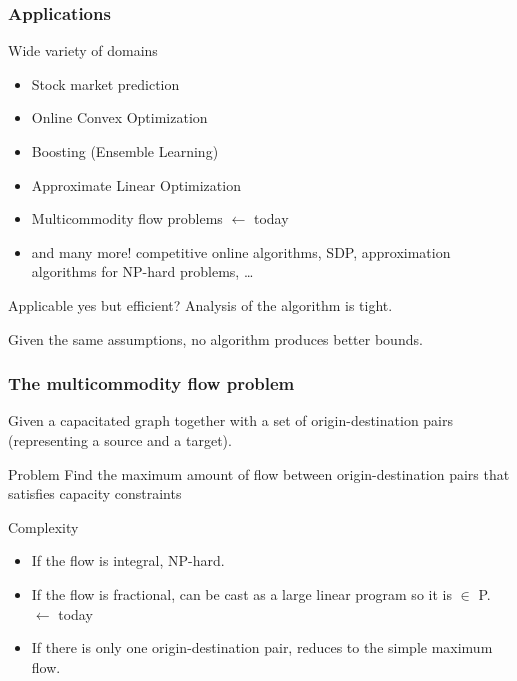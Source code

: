 \documentclass{beamer}
\begin{document}
\begin{frame}
    \frametitle{Applications}

    \begin{block}{Wide variety of domains}
        \begin{itemize}
            \item Stock market prediction
            \item Online Convex Optimization
            \item Boosting (Ensemble Learning)
            \item Approximate Linear Optimization
            \item Multicommodity flow problems $\leftarrow$ \alert{today}
            \item and many more! competitive online algorithms, SDP,
                approximation algorithms for NP-hard problems, \ldots
        \end{itemize}
    \end{block}

    \begin{block}{Applicable yes but efficient?}
        Analysis of the algorithm is tight.
        
        Given the same assumptions, no
        algorithm produces better bounds.
    \end{block}

\end{frame}

\begin{frame}
    \frametitle{The multicommodity flow problem}

    Given a capacitated graph together with a set of origin-destination pairs
    (representing a source and a target).
    
    \begin{block}{Problem}
        Find the maximum amount of flow between origin-destination pairs that
        satisfies capacity constraints
    \end{block}

    \begin{block}{Complexity}
        \begin{itemize}
            \item If the flow is integral, NP-hard.
            \item If the flow is fractional, can be cast as a large linear
                program so it is $\in$ P. $\leftarrow$ \alert{today}
            \item If there is only one origin-destination pair, reduces to
                the simple maximum flow.
        \end{itemize}
    \end{block}
\end{frame}
\end{document}
